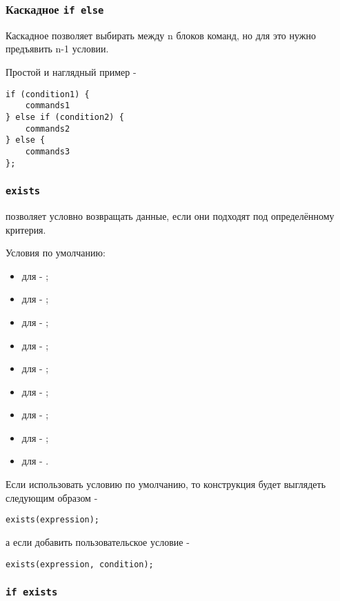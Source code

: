 \documentclass[a4paper, 14pt]{extarticle}
\newenvironment{icItems}
	{ \begin{itemize} [noitemsep,nolistsep] }
	{ \end{itemize} }
\begin{document}
\subsubsection{Каскадное \lstinline`if else`}

Каскадное  позволяет выбирать между n блоков команд, но для это нужно предъявить n-1 условии.

\noindent Простой и наглядный пример -
\begin{lstlisting}[numbers=none]
if (condition1) {
	commands1
} else if (condition2) {
	commands2
} else {
	commands3
};
\end{lstlisting}

\subsubsection{\lstinline`exists`}

 позволяет условно возвращать данные, если они подходят под определённому критерия.

Условия по умолчанию:
\begin{icItems}
\item
	для \bool - ;
\item
	для \integer - ;
\item
	для \double - ;
\item
	для \str - ;
\item
	для \listtype - ;
\item
	для \object - ;
\item
	для \set - ;
\item
	для \request - ;
\item
	для \element - .
\end{icItems}

Если использовать условию по умолчанию, то конструкция будет выглядеть следующим образом -
\begin{lstlisting}[numbers=none]
exists(expression);
\end{lstlisting}
а если добавить пользовательское условие -
\begin{lstlisting}[numbers=none]
exists(expression, condition);
\end{lstlisting}

\subsubsection{\lstinline`if exists`}
\end{document}
